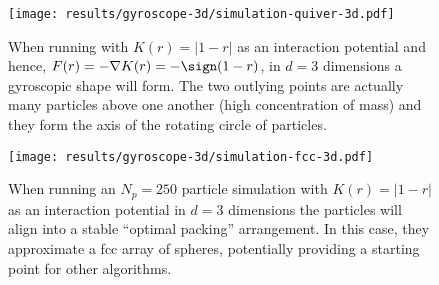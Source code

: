 \begin{figure}[H]
  \centering
  \texttt{[image: results/gyroscope-3d/simulation-quiver-3d.pdf]}
  \caption{When running with $K(r) = |1-r|$ as an interaction potential and hence, $F(r) = -\nabla K(r) = -\sign(1-r)$, in $d=3$ dimensions a gyroscopic shape will form. The two outlying points are actually many particles above one another (high concentration of mass) and they form the axis of the rotating circle of particles.}
  \label{fig:gyroscope-quiver-3d}
\end{figure}

\begin{figure}[H]
  \centering
  \texttt{[image: results/gyroscope-3d/simulation-fcc-3d.pdf]}
  \caption{When running an $N_p = 250$ particle simulation with $K(r) = |1-r|$ as an interaction potential in $d=3$ dimensions the particles will align into a stable ``optimal packing'' arrangement. In this case, they approximate a \gls{fcc} array of spheres, potentially providing a starting point for other algorithms.}
  \label{fig:fcc-quiver-3d}
\end{figure}


